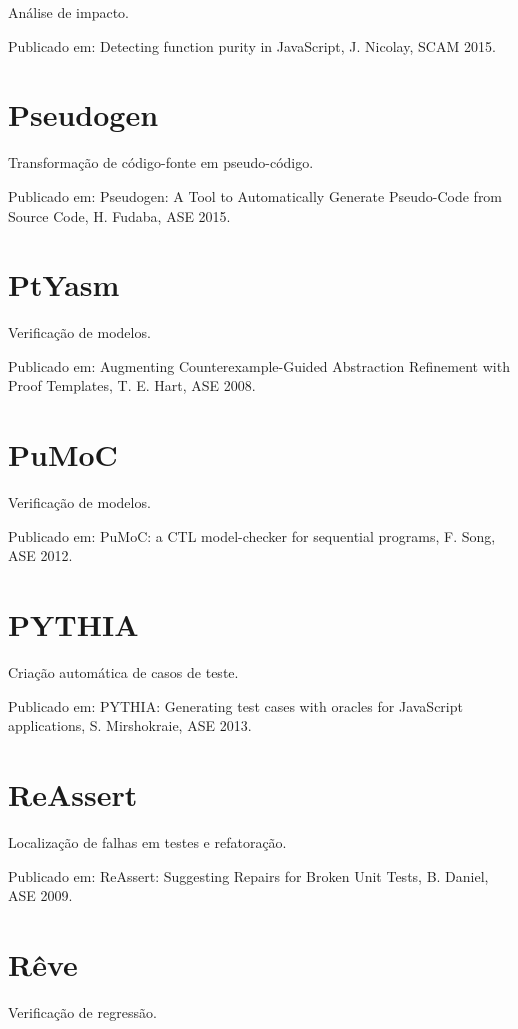 Análise de impacto.

Publicado em: Detecting function purity in JavaScript,
J. Nicolay,
SCAM
2015.

\section{Pseudogen}

Transformação de código-fonte em pseudo-código.

Publicado em: Pseudogen: A Tool to Automatically Generate Pseudo-Code from Source Code,
H. Fudaba,
ASE
2015.

\section{PtYasm}

Verificação de modelos.

Publicado em: Augmenting Counterexample-Guided Abstraction Refinement with Proof Templates,
T. E. Hart,
ASE
2008.

\section{PuMoC}

Verificação de modelos.

Publicado em: PuMoC: a CTL model-checker for sequential programs,
F. Song,
ASE
2012.

\section{PYTHIA}

Criação automática de casos de teste.

Publicado em: PYTHIA: Generating test cases with oracles for JavaScript applications,
S. Mirshokraie,
ASE
2013.

\section{ReAssert}

Localização de falhas em testes e refatoração.

Publicado em: ReAssert: Suggesting Repairs for Broken Unit Tests,
B. Daniel,
ASE
2009.

\section{Rêve}

Verificação de regressão.

